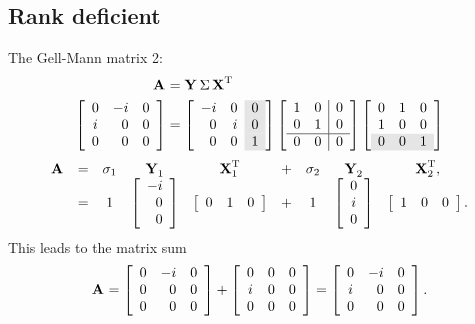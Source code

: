 \subsection{Rank deficient}
The Gell-Mann matrix 2:
\begin{equation}
  \begin{split}
    \svda{T}\\
    \gmb&=\left[
\begin{array}{rr>{\columncolor{ltgray}}r}
 -i & 0 & 0 \\
 0 & i & 0 \\
 0 & 0 & 1
\end{array}
\right]\left[
\begin{array}{rr|r}
 1 & 0 & 0 \\
 0 & 1 & 0 \\\hline
 0 & 0 & 0
\end{array}
\right]\left[
\begin{array}{rrr}
 0 & 1 & 0 \\
 1 & 0 & 0 \\
\rowcolor{ltgray}
 0 & 0 & 1
\end{array}
\right]    
  \end{split}
\end{equation}
\begin{equation}
  \begin{array}{ccccccccc}
    \A{} &=& \sigma_{1} & \Y{}_{1} & \X{T}_{1} &+& \sigma_{2} & \Y{}_{2} & \X{T}_{2}, \\
     &=& 1 & \mat{r}{-i\\0\\0} & \mat{rrr}{0&1&0} &+& 1 & \mat{c}{0\\i\\0} & \mat{rrr}{1&0&0}.
  \end{array}
\end{equation}
This leads to the matrix sum
\begin{equation}
     \A{} = \mat{rrr}{0&-i&0\\0&0&0\\0&0&0} + \mat{ccc}{0&0&0\\i&0&0\\0&0&0}= \mat{crr}{0&-i&0\\i&0&0\\0&0&0}.
\end{equation}
